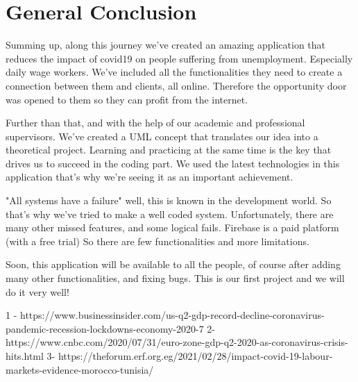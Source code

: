 \documentclass[12pt]{report}
\begin{document}
\chapter*{General Conclusion}
Summing up, along this journey we've created an amazing application that reduces the impact of covid19 on people suffering from unemployment. Especially daily wage workers.
We've included all the functionalities they need to create a connection between them and clients, all online.
Therefore the opportunity door was opened to them so they can profit from the internet.

Further than that, and with the help of our academic and professional supervisors. We've created a UML concept that translates our idea into a theoretical project.
Learning and practicing at the same time is the key that drives us to succeed in the coding part. We used the latest technologies in this application that's why we're seeing it as an important achievement.

"All systems have a failure" well, this is known in the development world. So that's why we've tried to make a well coded system.
Unfortunately, there are many other missed features, and some logical fails. Firebase is a paid platform (with a free trial) So there are few functionalities and more limitations.

Soon, this application will be available to all the people, of course after adding many other functionalities, and fixing bugs. This is our first project and we will do it very well!


1 - https://www.businessinsider.com/us-q2-gdp-record-decline-coronavirus-pandemic-recession-lockdowns-economy-2020-7
2-  https://www.cnbc.com/2020/07/31/euro-zone-gdp-q2-2020-as-coronavirus-crisis-hits.html
3- https://theforum.erf.org.eg/2021/02/28/impact-covid-19-labour-markets-evidence-morocco-tunisia/
\end{document}
